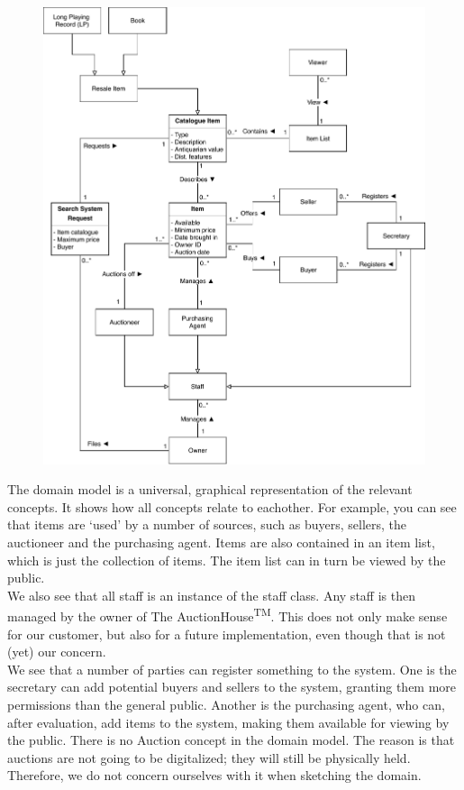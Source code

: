 \begin{figure}[H]
	\centering
	\includegraphics[scale=.9]{domainmodelUPD3.pdf}
\end{figure}

The domain model is a universal, graphical representation of the relevant concepts. It shows how all concepts relate to eachother. For example, you can see that items are `used' by a number of sources, such as buyers, sellers, the auctioneer and the purchasing agent. Items are also contained in an item list, which is just the collection of items. The item list can in turn be viewed by the public.\\
We also see that all staff is an instance of the staff class. Any staff is then managed by the owner of The AuctionHouse\textsuperscript{TM}. This does not only make sense for our customer, but also for a future implementation, even though that is not (yet) our concern.\\
We see that a number of parties can register something to the system. One is the secretary can add potential buyers and sellers to the system, granting them more permissions than the general public. Another is the purchasing agent, who can, after evaluation, add items to the system, making them available for viewing by the public.
There is no Auction concept in the domain model. The reason is that auctions are not going to be digitalized; they will still be physically held. Therefore, we do not concern ourselves with it when sketching the domain.
